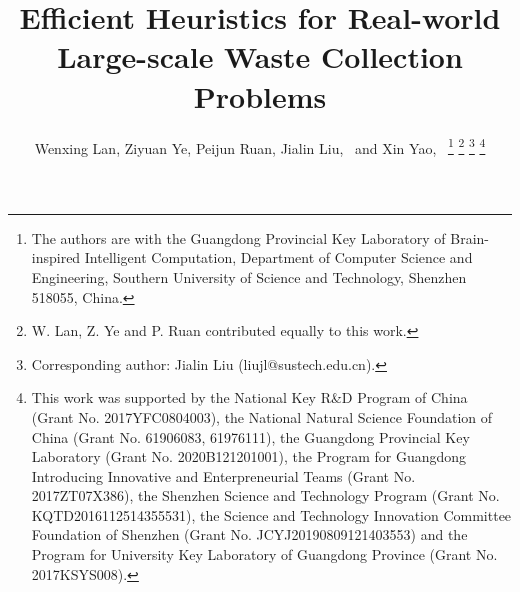 \documentclass[journal]{IEEEtran}
\begin{document}
%
\title{Efficient Heuristics for Real-world\\Large-scale Waste Collection Problems}
%
%
%

\author{Wenxing Lan, Ziyuan Ye, Peijun Ruan, Jialin Liu,~ and Xin Yao,~%
\thanks{The authors are with the Guangdong Provincial Key Laboratory of Brain-inspired Intelligent Computation, Department of Computer Science and Engineering, Southern University of Science and Technology, Shenzhen 518055, China.}%
\thanks{W. Lan, Z. Ye and P. Ruan contributed equally to this work.}%
\thanks{Corresponding author: Jialin Liu (liujl@sustech.edu.cn).}%
\thanks{This work was supported by the National Key R\&D Program of China (Grant No. 2017YFC0804003), the National Natural Science Foundation of China (Grant No. 61906083, 61976111), the Guangdong Provincial Key Laboratory (Grant No. 2020B121201001), the Program for Guangdong Introducing Innovative and Enterpreneurial Teams (Grant No. 2017ZT07X386), the Shenzhen Science and Technology Program (Grant No. KQTD2016112514355531), the Science and Technology Innovation Committee Foundation of Shenzhen (Grant No. JCYJ20190809121403553) and the Program for University Key Laboratory of Guangdong Province (Grant No. 2017KSYS008).}
}
% 
\end{document}
